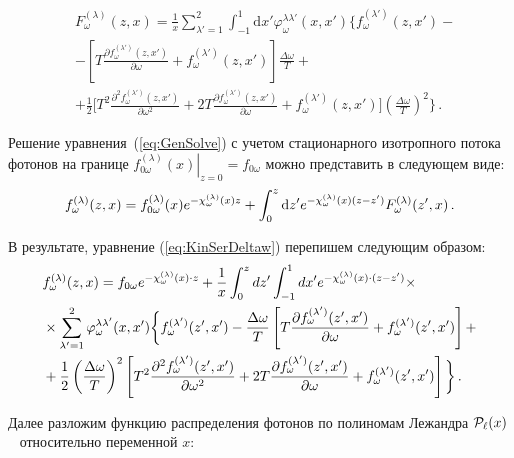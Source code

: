 \documentclass[14pt, russian]{article}
\newcommand{\dd}{\mathrm{d}} %
\begin{document}
\begin{equation}
	\begin{aligned}
		&F_\omega^{(\lambda)}(z,x)= \frac{1}{x} \sum_{\lambda'=1}^{2}\int_{-1}^{1}\dd x' \varphi_\omega^{\lambda\lambda'}(x,x')\bigg\{  f^{(\lambda')}_{\omega}(z,x') -
		\\
		&-  
		\left[
		T \frac{\partial f_\omega^{(\lambda')}(z,x')}{\partial \omega} + f_\omega^{(\lambda')}(z,x')
		\right]\frac{\Delta \omega}{T}+
		\\
		&+ \frac{1}{2}  
		\bigg[
		T^2 \frac{\partial^2 f_\omega^{(\lambda')}(z,x')}{\partial \omega^2}+ 2T \frac{\partial f_\omega^{(\lambda')}(z,x')}{\partial \omega}+f_\omega^{(\lambda')}(z,x')
		\bigg]\left(\frac{\Delta\omega}{T}\right)^2\bigg\}
		\,  .
	\end{aligned}
\end{equation}

Решение уравнения~(\ref{eq:GenSolve}) с учетом стационарного изотропного потока фотонов на границе  $\left.f^{(\lambda)}_{0\omega}(x)\right|_{z=0}=f_{0\omega}$ можно представить в следующем виде:
\begin{equation}
	f^{(\lambda)}_\omega(z,x)= f^{(\lambda)}_{0\omega}(x) e^{-{\cal \chi}_\omega^{(\lambda)}(x)z}+\int_{0}^{z}\dd z' e^{-{\cal \chi}_\omega^{(\lambda)}(x)(z-z')} F_\omega^{(\lambda)}(z',x)\, .
\end{equation}

В результате, уравнение (\ref{eq:KinSerDeltaw}) перепишем следующим образом:
\begin{equation}\label{FormSol}
\begin{aligned}
&f_\omega^{(\lambda)}(z,x)=f_{0\omega} 	e^{-{\cal \chi}_\omega^{(\lambda)}(x)\cdot z} + \frac{1}{x}\int_{0}^{z}dz'\int_{-1}^{1}dx' e^{-{\cal \chi}_\omega^{(\lambda)}(x)\cdot (z-z')}\times 
\\
&\times\sum_{\lambda'=1}^2\varphi_\omega^{\lambda 	\lambda'}(x,x')\bigg\{f_\omega^{(\lambda')}(z',x') - \frac{\Delta \omega}{T}
\left[
T \frac{\partial f_\omega^{(\lambda')}(z',x')}{\partial \omega} + f_\omega^{(\lambda')}(z',x')
\right]+
\\
&+ \frac{1}{2}\left(\frac{\Delta \omega}{T}\right)^2
\left[
T^2 \frac{\partial^2 f_\omega^{(\lambda')}(z',x')}{\partial \omega^2} + 2T \frac{\partial f_\omega^{(\lambda')}(z',x')}{\partial \omega}+f_\omega^{(\lambda')}(z',x')
\right]\bigg\}\, .
\end{aligned}	
\end{equation}


Далее разложим функцию распределения фотонов по полиномам Лежандра ${\cal P}_\ell(x)$~\cite{Gradstein:1963} относительно переменной $x$:
\end{document}
